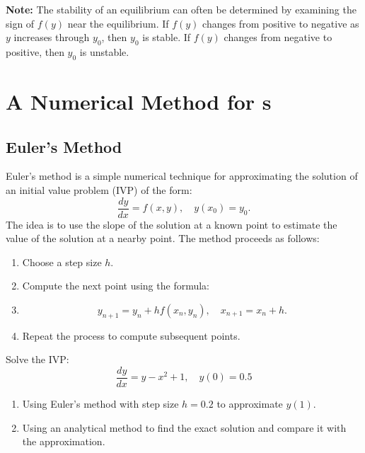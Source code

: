 \textbf{Note:} The stability of an equilibrium can often be determined by examining the sign of \(f(y)\) near the equilibrium.
If \(f(y)\) changes from positive to negative as \(y\) increases through \(y_0\), then \(y_0\) is stable.
If \(f(y)\) changes from negative to positive, then \(y_0\) is unstable.




\section{A Numerical Method for \ode{}s}
\subsection{Euler's Method}
Euler's method is a simple numerical technique for approximating the solution of an initial value problem (IVP) of the form:
\[\frac{dy}{dx} = f(x,y), \quad y(x_0) = y_0.
\]
The idea is to use the slope of the solution at a known point to estimate the value of the solution at a nearby point.
The method proceeds as follows:
\begin{enumerate}
    \item Choose a step size \(h\).
    \item Compute the next point using the formula:
    \item \[y_{n+1} = y_n + h f(x_n, y_n), \quad x_{n+1} = x_n + h.\]
    \item Repeat the process to compute subsequent points.
\end{enumerate}


\begin{example}
  Solve the IVP:
  \[\frac{dy}{dx} = y - x^2 + 1, \quad y(0) = 0.5\]
  \begin{enumerate}
    \item Using Euler's method with step size \(h = 0.2\) to approximate \(y(1)\).
    \item Using an analytical method to find the exact solution and compare it with the approximation.
  \end{enumerate}
\end{example}



